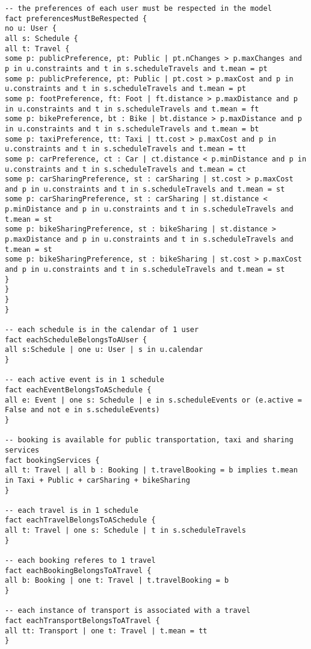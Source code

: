 \begin{lstlisting}[language=alloy]
-- the preferences of each user must be respected in the model
fact preferencesMustBeRespected {
no u: User {
all s: Schedule {
all t: Travel {
some p: publicPreference, pt: Public | pt.nChanges > p.maxChanges and p in u.constraints and t in s.scheduleTravels and t.mean = pt
some p: publicPreference, pt: Public | pt.cost > p.maxCost and p in u.constraints and t in s.scheduleTravels and t.mean = pt
some p: footPreference, ft: Foot | ft.distance > p.maxDistance and p in u.constraints and t in s.scheduleTravels and t.mean = ft
some p: bikePreference, bt : Bike | bt.distance > p.maxDistance and p in u.constraints and t in s.scheduleTravels and t.mean = bt
some p: taxiPreference, tt: Taxi | tt.cost > p.maxCost and p in u.constraints and t in s.scheduleTravels and t.mean = tt
some p: carPreference, ct : Car | ct.distance < p.minDistance and p in u.constraints and t in s.scheduleTravels and t.mean = ct
some p: carSharingPreference, st : carSharing | st.cost > p.maxCost and p in u.constraints and t in s.scheduleTravels and t.mean = st
some p: carSharingPreference, st : carSharing | st.distance < p.minDistance and p in u.constraints and t in s.scheduleTravels and t.mean = st
some p: bikeSharingPreference, st : bikeSharing | st.distance > p.maxDistance and p in u.constraints and t in s.scheduleTravels and t.mean = st
some p: bikeSharingPreference, st : bikeSharing | st.cost > p.maxCost and p in u.constraints and t in s.scheduleTravels and t.mean = st
}
}
}
}

-- each schedule is in the calendar of 1 user
fact eachScheduleBelongsToAUser {
all s:Schedule | one u: User | s in u.calendar
}

-- each active event is in 1 schedule
fact eachEventBelongsToASchedule {
all e: Event | one s: Schedule | e in s.scheduleEvents or (e.active = False and not e in s.scheduleEvents)
}

-- booking is available for public transportation, taxi and sharing services
fact bookingServices {
all t: Travel | all b : Booking | t.travelBooking = b implies t.mean in Taxi + Public + carSharing + bikeSharing
}

-- each travel is in 1 schedule
fact eachTravelBelongsToASchedule {
all t: Travel | one s: Schedule | t in s.scheduleTravels
}

-- each booking referes to 1 travel
fact eachBookingBelongsToATravel {
all b: Booking | one t: Travel | t.travelBooking = b
}

-- each instance of transport is associated with a travel 
fact eachTransportBelongsToATravel {
all tt: Transport | one t: Travel | t.mean = tt
}


\end{lstlisting}
